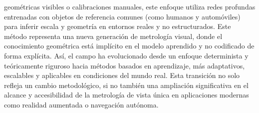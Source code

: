 geométricas visibles o calibraciones manuales, este enfoque utiliza redes profundas entrenadas con objetos de referencia comunes (como humanos
y automóviles) para inferir escala y geometría en entornos reales y no estructurados. Este método representa una nueva generación
de metrología visual, donde el conocimiento geométrica está implícito en el modelo aprendido y no codificado de forma explícita.
Así, el campo ha evolucionado desde un enfoque determinista y teóricamente riguroso hacia métodos basados en aprendizaje, más adaptativos,
escalables y aplicables en condiciones del mundo real. Esta transición no solo refleja un cambio metodológico, si no también una ampliación
significativa en el alcance y accesibilidad de la metrología de vista única en aplicaciones modernas como realidad aumentada o navegación
autónoma.
